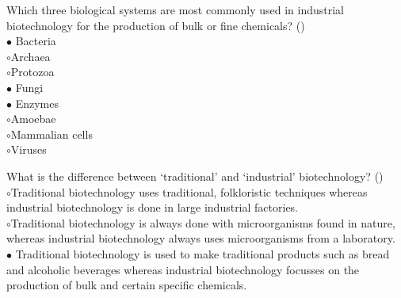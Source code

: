 \documentclass[]{beamer}
\begin{document}
\begin{CJK}{UTF8}{gbsn}
\begin{frame}[shrink] {} 
\addtocounter{questions}{1}
\color{blue}
  Which three biological systems are most commonly used in industrial biotechnology for the production of bulk or fine chemicals? 
 ({})\\
\color{black}
\setlength{\parindent}{-0.4cm}
{\color{red}$\bullet$} Bacteria   \\
{\color{red}$\circ$}Archaea   \\
{\color{red}$\circ$}Protozoa  \\
{\color{red}$\bullet$} Fungi  \\
{\color{red}$\bullet$} Enzymes  \\
{\color{red}$\circ$}Amoebae  \\
{\color{red}$\circ$}Mammalian cells  \\
{\color{red}$\circ$}Viruses  \\
\end{frame}


\begin{frame}[shrink] {} 
\addtocounter{questions}{1}
\color{blue}
  What is the difference between ‘traditional’ and ‘industrial’ biotechnology?
 ({})\\
\color{black}
\setlength{\parindent}{-0.4cm}
{\color{red}$\circ$}Traditional biotechnology uses traditional, folkloristic techniques whereas industrial biotechnology is done in large industrial factories.  \\
{\color{red}$\circ$}Traditional biotechnology is always done with microorganisms found in nature, whereas industrial biotechnology always uses microorganisms from a laboratory.  \\
{\color{red}$\bullet$} Traditional biotechnology  is used to make traditional products such as bread and alcoholic beverages whereas industrial biotechnology focusses on the production of bulk and certain specific chemicals.  \\
\end{frame}



\end{CJK}
\end{document}
